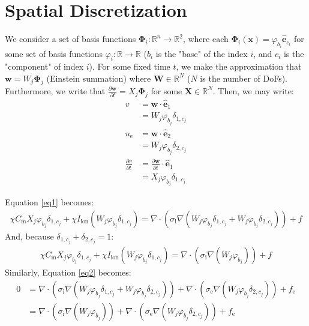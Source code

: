\documentclass{article}
\newcommand{\bvec}[1]{\boldsymbol{#1}}
\newcommand{\brvec}[1]{\mathbf{#1}}
\begin{document}
\newpage

\section{Spatial Discretization}

We consider a set of basis functions $\bvec{\Phi}_i : \mathbb{R}^n \rightarrow \mathbb{R}^2$,
where each $\bvec{\Phi}_i(\bvec{x}) = \varphi_{b_i} \hat{\brvec{e}}_{c_i}$
for some set of basis functions $\varphi_i : \mathbb{R} \rightarrow \mathbb{R}$
($b_i$ is the "base" of the index $i$, and $c_i$ is the "component" of index $i$).
For some fixed time $t$,
we make the approximation that $\bvec{w} = W_j \bvec{\Phi}_j$ (Einstein summation)
where $\bvec{W} \in \mathbb{R}^N$ ($N$ is the number of DoFs).
Furthermore, we write that $\frac{\partial \bvec{w}}{\partial t} = X_j \bvec{\Phi}_j$
for some $\bvec{X} \in \mathbb{R}^N$. Then, we may write:
\begin{align*}
    v & = \bvec{w} \cdot \hat{\brvec{e}}_1 \\
        & = W_j \varphi_{b_j} \delta_{1,c_j} \\
    u_\text{e} & = \bvec{w} \cdot \hat{\brvec{e}}_2 \\
        & = W_j \varphi_{b_j} \delta_{2,c_j} \\
    \frac{\partial v}{\partial t} & = \frac{\partial \bvec{w}}{\partial t} \cdot \hat{\brvec{e}}_1 \\
        & = X_j \varphi_{b_j} \delta_{1,c_j}
\end{align*}

Equation \ref{eq1} becomes:
\begin{align*}
    \chi C_\text{m} X_j \varphi_{b_j} \delta_{1,c_j}
            + \chi I_\text{ion}(W_j \varphi_{b_j} \delta_{1,c_j})
        = \nabla \cdot (\sigma_\text{i} \nabla (W_j \varphi_{b_j} \delta_{1,c_j} + W_j \varphi_{b_j} \delta_{2,c_j}))
            + f
\end{align*}
\noindent And, because $\delta_{1,c_j} + \delta_{2,c_j} = 1$:
\begin{align*}
    \chi C_\text{m} X_j \varphi_{b_j} \delta_{1,c_j}
            + \chi I_\text{ion}(W_j \varphi_{b_j} \delta_{1,c_j})
        = \nabla \cdot (\sigma_\text{i} \nabla (W_j \varphi_{b_j}))
            + f
\end{align*}
Similarly, Equation \ref{eq2} becomes:
\begin{align*}
    0 & = \nabla \cdot (\sigma_\text{i} \nabla (W_j \varphi_{b_j} \delta_{1,c_j} + W_j \varphi_{b_j} \delta_{2,c_j}))
            + \nabla \cdot (\sigma_\text{e} \nabla (W_j \varphi_{b_j} \delta_{2,c_j}))
            + f_\text{e} \\
        & = \nabla \cdot (\sigma_\text{i} \nabla (W_j \varphi_{b_j}))
            + \nabla \cdot (\sigma_\text{e} \nabla (W_j \varphi_{b_j} \delta_{2,c_j}))
            + f_\text{e}
\end{align*}
\end{document}
